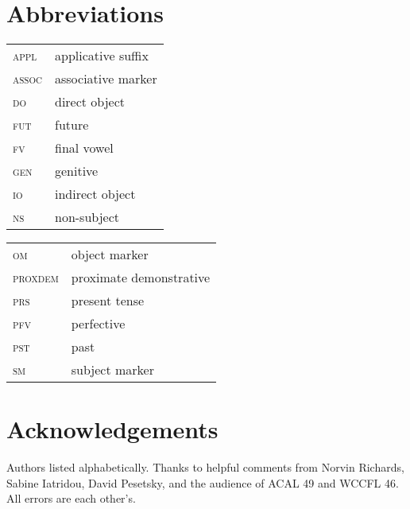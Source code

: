 \documentclass[output=paper,colorlinks,citecolor=brown]{langscibook}
\begin{document}
\section*{Abbreviations}

\begin{minipage}[t][][b]{.45\textwidth}
	\begin{tabularx}{\textwidth}{lQ}
		\textsc{appl}  &  applicative suffix\\
		\textsc{assoc}  &  associative marker\\
		\textsc{do}  &  direct object\\
		\textsc{fut}  &  future\\
		\textsc{fv}  &  final vowel\\
		\textsc{gen}  &  genitive\\
		\textsc{io}  &  indirect object\\
		\textsc{ns}  &  non-subject\\
	\end{tabularx}
\end{minipage}%
\begin{minipage}[t][][b]{.45\textwidth}
	\begin{tabularx}{\textwidth}{lQ}	
		\textsc{om}  &  object marker\\
		\textsc{proxdem}  &  proximate demonstrative\\
		\textsc{prs} \ &  present tense\\
		\textsc{pfv}  &  perfective\\
		\textsc{pst}  &  past\\
		\textsc{sm}  &  subject marker
	\end{tabularx}
\end{minipage}%

\section*{Acknowledgements}

Authors listed alphabetically. Thanks to helpful comments from Norvin Richards, Sabine Iatridou, David Pesetsky, and the audience of ACAL 49 and WCCFL 46. All errors are each other's.


{\sloppy\printbibliography[heading=subbibliography,notkeyword=this]}
\end{document}
